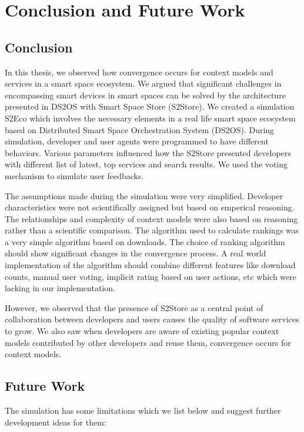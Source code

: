 \chapter{Conclusion and Future Work}
\label{chap:conclusion_and_future_work}

\section*{Conclusion}

In this thesis, we observed how convergence occurs for context models and services in a smart space ecosystem. We argued that significant challenges in encompassing smart devices in smart spaces can be solved by the architecture presented in DS2OS with Smart Space Store (S2Store). We created a simulation S2Eco which involves the necessary elements in a real life smart space ecosystem based on Distributed Smart Space Orchestration System (DS2OS). During simulation, developer and user agents were programmed to have different behaviors. Various parameters influenced how the S2Store presented developers with different list of latest, top services and search results. We used the voting mechanism to simulate user feedbacks.

The assumptions made during the simulation were very simplified. Developer characteristics were not scientifically assigned but based on emperical reasoning. The relationships and complexity of context models were also based on reasoning rather than a scientific comparison. The algorithm used to calculate rankings was a very simple algorithm based on downloads. The choice of ranking algorithm should show significant changes in the convergence process. A real world implementation of the algorithm should combine different features like download counts, manual user voting, implicit rating based on user actions, etc which were lacking in our implementation.

However, we observed that the presence of S2Store as a central point of collaboration between developers and users causes the quality of software services to grow. We also saw when developers are aware of existing popular context models contributed by other developers and reuse them, convergence occurs for context models.


\section*{Future Work}

The simulation has some limitations which we list below and suggest further development ideas for them:

